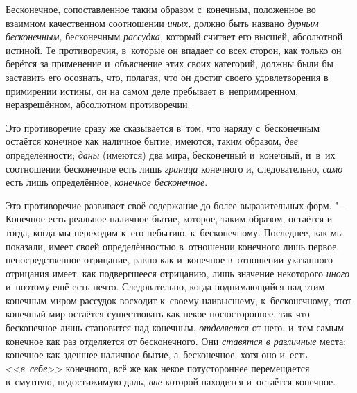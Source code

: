 Бесконечное, сопоставленное таким образом с~конечным, положенное во взаимном
качественном соотношении {\em иных,} должно быть
названо {\em дурным бесконечным,} бесконечным
{\em рассудка,} который считает его высшей, абсолютной
истиной. Те противоречия, в~которые он впадает со всех сторон, как только
он берётся за применение и~объяснение этих своих категорий, должны были бы
заставить его осознать, что, полагая, что он достиг своего удовлетворения в
примирении истины, он на самом деле пребывает в~непримиренном,
неразрешённом, абсолютном противоречии.

Это противоречие сразу же сказывается в~том, что наряду с~бесконечным
остаётся конечное как наличное бытие; имеются, таким образом,
{\em две} определённости;
{\em даны} (имеются) два мира, бесконечный и~конечный,
и~в~их соотношении бесконечное есть лишь {\em граница}
конечного и, следовательно, {\em само} есть лишь
определённое, {\em конечное бесконечное}.

Это противоречие развивает своё содержание до более выразительных форм. "---
Конечное есть реальное наличное бытие, которое, таким образом, остаётся и
тогда, когда мы переходим к~его небытию, к~бесконечному. Последнее, как мы
показали, имеет своей определённостью в~отношении конечного лишь первое,
непосредственное отрицание, равно как и~конечное в~отношении указанного
отрицания имеет, как подвергшееся отрицанию, лишь значение некоторого
{\em иного} и~поэтому ещё есть нечто. Следовательно,
когда поднимающийся над этим конечным миром рассудок восходит к~своему
наивысшему, к~бесконечному, этот конечный мир остаётся существовать как
некое посюстороннее, так что бесконечное лишь становится над конечным,
{\em отделяется} от него, и~тем самым конечное как раз
отделяется от бесконечного. Они {\em ставятся в
различные} места; конечное как здешнее наличное бытие, а~бесконечное, хотя
оно и~есть <<{\em в~себе}>> конечного, всё же как некое
потустороннее перемещается в~смутную, недостижимую даль,
{\em вне} которой находится и~остаётся конечное.

